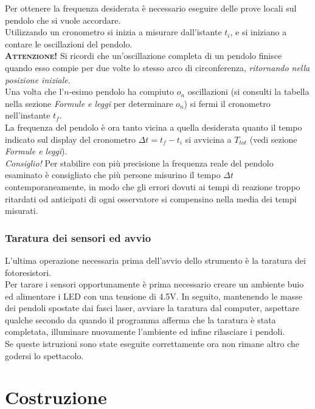 \documentclass[a4paper]{article}
\begin{document}
Per ottenere la frequenza desiderata è necessario eseguire delle prove locali sul pendolo che si vuole accordare.\\
Utilizzando un cronometro si inizia a misurare dall'istante $t_i$, e si iniziano a contare le oscillazioni del pendolo.\\
\textbf{\textsc{Attenzione!}} Si ricordi che un'oscillazione completa di un pendolo finisce quando esso compie per due volte lo stesso arco di circonferenza, \emph{ritornando nella posizione iniziale}.\\
Una volta che l'$n$-esimo pendolo ha compiuto $o_n$ oscillazioni (si consulti la tabella nella sezione \textit{Formule e leggi} per determinare $o_n$) si fermi il cronometro nell'instante $t_f$.\\

La frequenza del pendolo è ora tanto vicina a quella desiderata quanto il tempo indicato sul display del cronometro $\Delta t=t_f-t_i$ si avvicina a $T_{tot}$ (vedi sezione \textit{Formule e leggi}).\\

\emph{Consiglio!} Per stabilire con più precisione la frequenza reale del pendolo esaminato è consigliato che più persone misurino il tempo $\Delta t$ contemporaneamente, in modo che gli errori dovuti ai tempi di reazione troppo ritardati od anticipati di ogni osservatore si compensino nella media dei tempi misurati.

\subsubsection*{Taratura dei sensori ed avvio}

L'ultima operazione necessaria prima dell'avvio dello strumento è la taratura dei fotoresistori.\\

Per tarare i sensori opportunamente è prima necessario creare un ambiente buio ed alimentare i LED con una tensione di 4.5V. In seguito, mantenendo le masse dei pendoli spostate dai fasci laser, avviare la taratura dal computer, aspettare qualche secondo da quando il programma afferma che la taratura è stata completata, illuminare nuovamente l'ambiente ed infine rilasciare i pendoli.\\

Se queste istruzioni sono state eseguite correttamente ora non rimane altro che godersi lo spettacolo.\\

\section{Costruzione}
\end{document}
